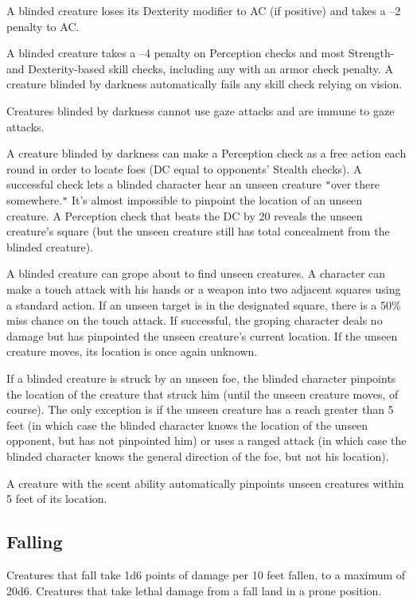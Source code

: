 A blinded creature loses its Dexterity modifier to AC (if positive) and takes a --2 penalty to AC.
				
A blinded creature takes a --4 penalty on Perception checks and most Strength- and Dexterity-based skill checks, including any with an armor check penalty. A creature blinded by darkness automatically fails any skill check relying on vision.
				
Creatures blinded by darkness cannot use gaze attacks and are immune to gaze attacks.
				
A creature blinded by darkness can make a Perception check as a free action each round in order to locate foes (DC equal to opponents' Stealth checks). A successful check lets a blinded character hear an unseen creature \texttt{{}"{}}over there somewhere.\texttt{{}"{}} It's almost impossible to pinpoint the location of an unseen creature. A Perception check that beats the DC by 20 reveals the unseen creature's square (but the unseen creature still has total concealment from the blinded creature).
				
A blinded creature can grope about to find unseen creatures. A character can make a touch attack with his hands or a weapon into two adjacent squares using a standard action. If an unseen target is in the designated square, there is a 50\% miss chance on the touch attack. If successful, the groping character deals no damage but has pinpointed the unseen creature's current location. If the unseen creature moves, its location is once again unknown.
				
If a blinded creature is struck by an unseen foe, the blinded character pinpoints the location of the creature that struck him (until the unseen creature moves, of course). The only exception is if the unseen creature has a reach greater than 5 feet (in which case the blinded character knows the location of the unseen opponent, but has not pinpointed him) or uses a ranged attack (in which case the blinded character knows the general direction of the foe, but not his location).
				
A creature with the scent ability automatically pinpoints unseen creatures within 5 feet of its location.
				
\subsection{Falling}

				
Creatures that fall take 1d6 points of damage per 10 feet fallen, to a maximum of 20d6. Creatures that take lethal damage from a fall land in a prone position.
				
